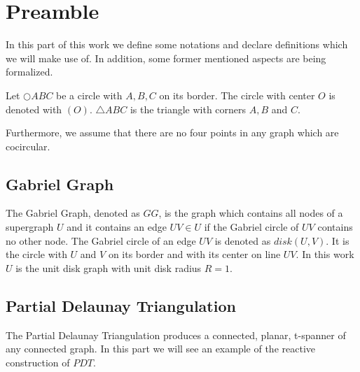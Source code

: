 \section{Preamble}
In this part of this work we define some notations and declare definitions which we will make use of.
In addition, some former mentioned aspects are being formalized.
 
Let $\bigcirc{ABC} $ be a circle with $A, B, C $ on its border.
The circle with center $O $ is denoted with $(O) $.
$\triangle{ABC} $ is the triangle with corners $A,B $ and $C $.

Furthermore, we assume that there are no four points in any graph which are cocircular.

\subsection{Gabriel Graph}
The Gabriel Graph, denoted as $GG $, is the graph which contains all nodes of a supergraph $U $ and it contains an edge $UV \in U $ if the Gabriel circle of $UV $ contains no other node.
The Gabriel circle of an edge $UV $ is denoted as $disk(U, V) $.
It is the circle with $U $ and $V $ on its border and with its center on line $UV $. 
In this work $U $ is the unit disk graph with unit disk radius $R = 1 $.

\subsection{Partial Delaunay Triangulation}
The Partial Delaunay Triangulation produces a connected, planar, t-spanner of any connected graph.
In this part we will see an example of the reactive construction of $PDT $.

